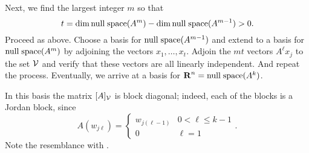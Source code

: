 \documentclass{ximera}
\begin{document}
Next, we find the largest integer $m$ so that 
\[
t=\dim{\rm null\;space}(A^m)-\dim{\rm null\;space}(A^{m-1})>0.
\]
Proceed as above.  Choose a basis for ${\rm null\;space}(A^{m-1})$ and extend to a basis 
for ${\rm null\;space}(A^m)$ by adjoining the vectors $x_1,\ldots,x_t$.  Adjoin the $mt$ 
vectors $A^\ell x_j$ to the set ${\cal V}$ and verify that these vectors are 
all linearly independent.  And repeat the process.  Eventually, we arrive at 
a basis for $\mbox{$\bf{R}$}^n={\rm null\;space}(A^k)$.  

In this basis the matrix $[A]_{\cal V}$ is block diagonal; indeed, each of 
the blocks is a Jordan block, since 
\[
A(w_{j\ell}) = \left\{\begin{array}{cl}w_{j(\ell-1)} & 0<\ell\le k-1\\ 0 & 
\ell=1 \end{array}\right. .
\]
Note the resemblance with .
\end{document}
